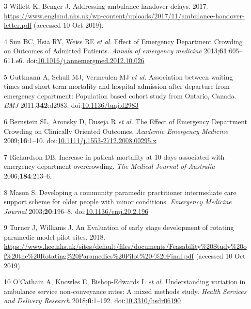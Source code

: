 \documentclass[
  a4paper,
  openany]{article}
\begin{document}
\leavevmode\hypertarget{ref-willett_addressing_2017}{}%
3 Willett K, Benger J. Addressing ambulance handover delays. 2017. \url{https://www.england.nhs.uk/wp-content/uploads/2017/11/ambulance-handover-letter.pdf} (accessed 10 Oct 2019).

\leavevmode\hypertarget{ref-sun_effect_2013}{}%
4 Sun BC, Hsia RY, Weiss RE \emph{et al.} Effect of Emergency Department Crowding on Outcomes of Admitted Patients. \emph{Annals of emergency medicine} 2013;\textbf{61}:605--611.e6. doi:\href{https://doi.org/10.1016/j.annemergmed.2012.10.026}{10.1016/j.annemergmed.2012.10.026}

\leavevmode\hypertarget{ref-guttmann_association_2011}{}%
5 Guttmann A, Schull MJ, Vermeulen MJ \emph{et al.} Association between waiting times and short term mortality and hospital admission after departure from emergency department: Population based cohort study from Ontario, Canada. \emph{BMJ} 2011;\textbf{342}:d2983. doi:\href{https://doi.org/10.1136/bmj.d2983}{10.1136/bmj.d2983}

\leavevmode\hypertarget{ref-bernstein_effect_2009}{}%
6 Bernstein SL, Aronsky D, Duseja R \emph{et al.} The Effect of Emergency Department Crowding on Clinically Oriented Outcomes. \emph{Academic Emergency Medicine} 2009;\textbf{16}:1--10. doi:\href{https://doi.org/10.1111/j.1553-2712.2008.00295.x}{10.1111/j.1553-2712.2008.00295.x}

\leavevmode\hypertarget{ref-richardson_increase_2006}{}%
7 Richardson DB. Increase in patient mortality at 10 days associated with emergency department overcrowding. \emph{The Medical Journal of Australia} 2006;\textbf{184}:213--6.

\leavevmode\hypertarget{ref-mason_developing_2003}{}%
8 Mason S. Developing a community paramedic practitioner intermediate care support scheme for older people with minor conditions. \emph{Emergency Medicine Journal} 2003;\textbf{20}:196--8. doi:\href{https://doi.org/10.1136/emj.20.2.196}{10.1136/emj.20.2.196}

\leavevmode\hypertarget{ref-turner_evaluation_2018}{}%
9 Turner J, Williams J. An Evaluation of early stage development of rotating paramedic model pilot sites. 2018. \url{https://www.hee.nhs.uk/sites/default/files/documents/Feasability\%20Study\%20of\%20the\%20Rotating\%20Paramedics\%20Pilot\%20-\%20Final.pdf} (accessed 10 Oct 2019).

\leavevmode\hypertarget{ref-ocathain_understanding_2018}{}%
10 O'Cathain A, Knowles E, Bishop-Edwards L \emph{et al.} Understanding variation in ambulance service non-conveyance rates: A mixed methods study. \emph{Health Services and Delivery Research} 2018;\textbf{6}:1--192. doi:\href{https://doi.org/10.3310/hsdr06190}{10.3310/hsdr06190}
\end{document}
